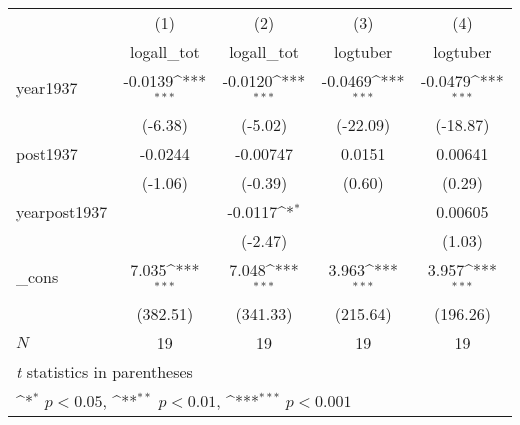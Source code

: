 {
\def\sym#1{\ifmmode^{#1}\else\(^{#1}\)\fi}
\begin{tabular}{l*{4}{c}}
\hline\hline
            &\multicolumn{1}{c}{(1)}&\multicolumn{1}{c}{(2)}&\multicolumn{1}{c}{(3)}&\multicolumn{1}{c}{(4)}\\
            &\multicolumn{1}{c}{logall\_tot}&\multicolumn{1}{c}{logall\_tot}&\multicolumn{1}{c}{logtuber}&\multicolumn{1}{c}{logtuber}\\
\hline
year1937    &     -0.0139\sym{***}&     -0.0120\sym{***}&     -0.0469\sym{***}&     -0.0479\sym{***}\\
            &     (-6.38)         &     (-5.02)         &    (-22.09)         &    (-18.87)         \\
[1em]
post1937    &     -0.0244         &    -0.00747         &      0.0151         &     0.00641         \\
            &     (-1.06)         &     (-0.39)         &      (0.60)         &      (0.29)         \\
[1em]
yearpost1937&                     &     -0.0117\sym{*}  &                     &     0.00605         \\
            &                     &     (-2.47)         &                     &      (1.03)         \\
[1em]
\_cons      &       7.035\sym{***}&       7.048\sym{***}&       3.963\sym{***}&       3.957\sym{***}\\
            &    (382.51)         &    (341.33)         &    (215.64)         &    (196.26)         \\
\hline
\(N\)       &          19         &          19         &          19         &          19         \\
\hline\hline
\multicolumn{5}{l}{\footnotesize \textit{t} statistics in parentheses}\\
\multicolumn{5}{l}{\footnotesize \sym{*} \(p<0.05\), \sym{**} \(p<0.01\), \sym{***} \(p<0.001\)}\\
\end{tabular}
}
